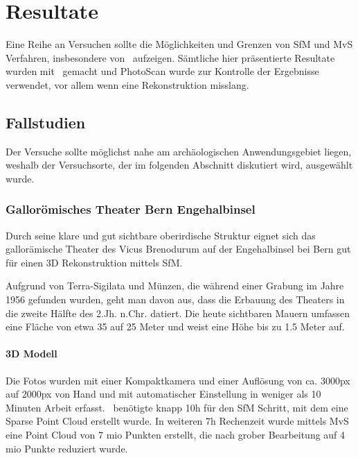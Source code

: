 \chapter{Resultate} \label{resultate}
	Eine Reihe an Versuchen sollte die Möglichkeiten und Grenzen von SfM und MvS Verfahren, insbesondere von \dronarch\ aufzeigen. Sämtliche hier präsentierte Resultate wurden mit \dronarch\ gemacht und PhotoScan wurde zur Kontrolle der Ergebnisse verwendet, vor allem wenn eine Rekonstruktion misslang.
	
	\section{Fallstudien}\label{res:fall}
		Der Versuche sollte möglichst nahe am archäologischen Anwendungsgebiet liegen, weshalb der Versuchsorte, der im folgenden Abschnitt diskutiert wird, ausgewählt wurde.

		\subsection{Gallorömisches Theater Bern Engehalbinsel}
			Durch seine klare und gut sichtbare oberirdische Struktur eignet sich das gallorämische Theater des Vicus Brenodurum auf der Engehalbinsel bei Bern gut für einen 3D Rekonstruktion mittels SfM.
			
			Aufgrund von Terra-Sigilata und Münzen, die während einer Grabung im Jahre 1956 gefunden wurden, geht man davon aus, dass die Erbauung des Theaters in die zweite Hälfte des 2.Jh. n.Chr. datiert. Die heute sichtbaren Mauern umfassen eine Fläche von etwa 35 auf 25 Meter und weist eine Höhe bis zu 1.5 Meter auf.	
							
			\subsubsection{3D Modell}
				Die Fotos wurden mit einer Kompaktkamera und einer Auflösung von ca. 3000px auf 2000px von Hand und mit automatischer Einstellung in weniger als 10 Minuten Arbeit erfasst.
				\dronarch\ benötigte knapp 10h für den SfM Schritt, mit dem eine Sparse Point Cloud erstellt wurde.
				In weiteren 7h Rechenzeit wurde mittels MvS eine Point Cloud von 7 mio Punkten erstellt, die nach grober Bearbeitung auf 4 mio Punkte reduziert wurde.

